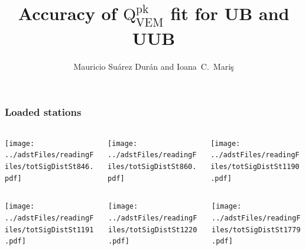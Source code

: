 \documentclass[aspectratio=169]{beamer}
\title{Accuracy of $\mathrm{Q}^{\mathrm{pk}}_{\mathrm{VEM}}$ fit for UB and UUB}
\author{
  Mauricio Su\'arez Dur\'an and Ioana~C.~Mari\c{s}
}
\institute{IIHE-ULB}
\begin{document}
\begin{frame}
  \titlepage
\end{frame}


\begin{frame}
  \frametitle{Loaded stations}
  \begin{columns}
    \begin{column}{0.33\textwidth}
      \texttt{[image: ../adstFiles/readingFiles/totSigDistSt846.pdf]}
    \end{column}
    \begin{column}{0.33\textwidth}
      \texttt{[image: ../adstFiles/readingFiles/totSigDistSt860.pdf]}
    \end{column}
    \begin{column}{0.33\textwidth}
      \texttt{[image: ../adstFiles/readingFiles/totSigDistSt1190.pdf]}
    \end{column}

  \end{columns}

  \begin{columns}
    \begin{column}{0.33\textwidth}
      \texttt{[image: ../adstFiles/readingFiles/totSigDistSt1191.pdf]}
    \end{column}
    \begin{column}{0.33\textwidth}
      \texttt{[image: ../adstFiles/readingFiles/totSigDistSt1220.pdf]}
    \end{column}
    \begin{column}{0.33\textwidth}
      \texttt{[image: ../adstFiles/readingFiles/totSigDistSt1779.pdf]}
    \end{column}

  \end{columns}
\end{frame}
\end{document}
